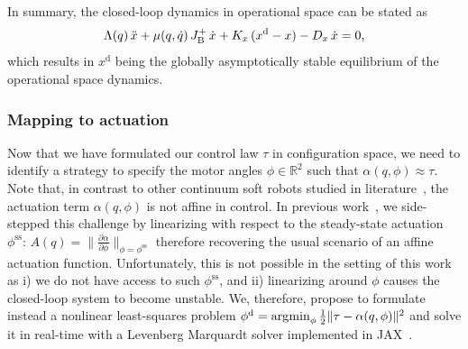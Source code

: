 
In summary, the closed-loop dynamics in operational space can be stated as
\begin{equation}\label{eq:hsacontrol:task_space_impedance_control:closed_loop_dynamics}
    \Lambda(q) \, \Ddot{x} + \mu(q,\dot{q}) \, J_\mathrm{B}^+ \, \dot{x} + K_x \, (x^\mathrm{d} - x) - D_x \, \dot{x} = 0,
\end{equation}
which results in $x^\mathrm{d}$ being the globally asymptotically stable equilibrium of the operational space dynamics.


\subsubsection{Mapping to actuation}
%
Now that we have formulated our control law $\tau$ in configuration space, we need to identify a strategy to specify the motor angles $\phi \in \mathbb{R}^2$ such that $\alpha(q,\phi) \approx \tau$. Note that, in contrast to other continuum soft robots studied in literature~\citep{della2023model}, the actuation term $\alpha(q,\phi)$ is not affine in control. %
In previous work~\citep{stolzle2024experimental}, we side-stepped this challenge by linearizing with respect to the steady-state actuation $\phi^\mathrm{ss}$: $A(q) = \lVert \frac{\partial \alpha}{\partial \phi}\rVert_{\phi=\phi^\mathrm{ss}}$ therefore recovering the usual scenario of an affine actuation function. Unfortunately, this is not possible in the setting of this work as i) we do not have access to such $\phi^\mathrm{ss}$, and ii) linearizing around $\phi$ causes the closed-loop system to become unstable. We, therefore, propose to formulate instead a nonlinear least-squares problem $\phi^\mathrm{d} = \operatorname*{\arg\!\min}_\phi \frac{1}{2} \lVert \tau - \alpha(q,\phi) \rVert^2$ and solve it in real-time with a Levenberg Marquardt solver implemented in JAX~\citep{jaxopt_implicit_diff}.

